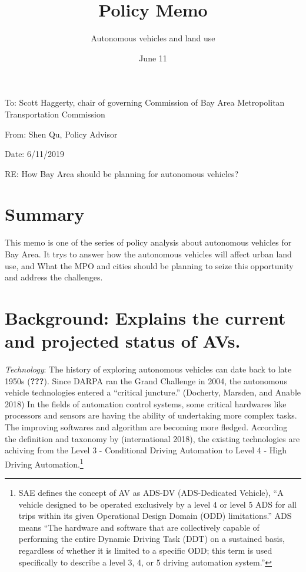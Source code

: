 \documentclass[12pt,]{article}
\title{Policy Memo}
\subtitle{Autonomous vehicles and land use}
\author{}
\date{June 11}
\let\rmarkdownfootnote\footnote%
\def\footnote{\protect\rmarkdownfootnote}
\begin{document}
\maketitle

To: Scott Haggerty, chair of governing Commission of Bay Area
Metropolitan Transportation Commission

From: Shen Qu, Policy Advisor

Date: 6/11/2019

RE: How Bay Area should be planning for autonomous vehicles?

\hypertarget{summary}{%
\section{Summary}\label{summary}}

This memo is one of the series of policy analysis about autonomous
vehicles for Bay Area. It trys to answer how the autonomous vehicles
will affect urban land use, and What the MPO and cities should be
planning to seize this opportunity and address the challenges.

\hypertarget{background-explains-the-current-and-projected-status-of-avs.}{%
\section{Background: Explains the current and projected status of
AVs.}\label{background-explains-the-current-and-projected-status-of-avs.}}

\emph{Technology}: The history of exploring autonomous vehicles can date
back to late 1950s ({\textbf{???}}). Since DARPA ran the Grand Challenge
in 2004, the autonomous vehicle technologies entered a ``critical
juncture.'' (Docherty, Marsden, and Anable 2018) In the fields of
automation control systems, some critical hardwares like processors and
sensors are having the ability of undertaking more complex tasks. The
improving softwares and algorithm are becoming more fledged. According
the definition and taxonomy by (international 2018), the existing
technologies are achiving from the Level 3 - Conditional Driving
Automation to Level 4 - High Driving Automation.\footnote{SAE defines
  the concept of AV as ADS-DV (ADS-Dedicated Vehicle), ``A vehicle
  designed to be operated exclusively by a level 4 or level 5 ADS for
  all trips within its given Operational Design Domain (ODD)
  limitations.'' ADS means ``The hardware and software that are
  collectively capable of performing the entire Dynamic Driving Task
  (DDT) on a sustained basis, regardless of whether it is limited to a
  specific ODD; this term is used specifically to describe a level 3, 4,
  or 5 driving automation system.''}
\end{document}
